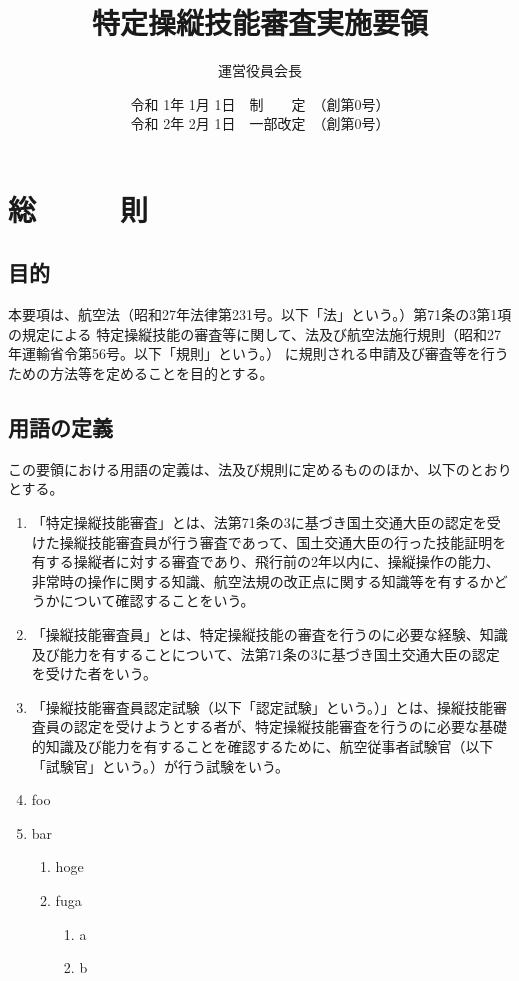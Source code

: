 \documentclass[a4paper,papersize,12pt]{jsarticle}
\author{\color{red}運営役員会長}
\title{\color{red}特定操縦技能審査実施要領}
\date{
    {
        \color{red}
        令和 1年 1月 1日　制　　定　（創第0号）\\
        令和 2年 2月 1日　一部改定　（創第0号）
    }
}
\begin{document}
\maketitle

\section{総　　　則}
\subsection{目的}
本要項は、航空法（昭和27年法律第231号。以下「法」という。）第71条の3第1項の規定による
特定操縦技能の審査等に関して、法及び航空法施行規則（昭和27年運輸省令第56号。以下「規則」という。）
に規則される申請及び審査等を行うための方法等を定めることを目的とする。

\subsection{用語の定義}
この要領における用語の定義は、法及び規則に定めるもののほか、以下のとおりとする。

\begin{enumerate}[label=(\arabic*)]
    \item 「特定操縦技能審査」とは、法第71条の3に基づき国土交通大臣の認定を受けた操縦技能審査員が行う審査であって、国土交通大臣の行った技能証明を有する操縦者に対する審査であり、飛行前の2年以内に、操縦操作の能力、非常時の操作に関する知識、航空法規の改正点に関する知識等を有するかどうかについて確認することをいう。
    \item 「操縦技能審査員」とは、特定操縦技能の審査を行うのに必要な経験、知識及び能力を有することについて、法第71条の3に基づき国土交通大臣の認定を受けた者をいう。
    \item 「操縦技能審査員認定試験（以下「認定試験」という。）」とは、操縦技能審査員の認定を受けようとする者が、特定操縦技能審査を行うのに必要な基礎的知識及び能力を有することを確認するために、航空従事者試験官（以下「試験官」という。）が行う試験をいう。
    \item foo
    \item bar
    \begin{enumerate}[label=\aiu*.]
        \item hoge
        \item fuga
        \begin{enumerate}[label=(\aiu*)]
            \item a
            \item b
        \end{enumerate}
    \end{enumerate}
\end{enumerate}
\end{document}
